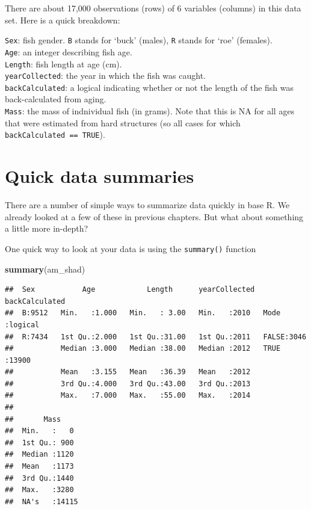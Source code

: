 \documentclass[
]{book}
\newenvironment{Shaded}{\begin{snugshade}}{\end{snugshade}}
\newcommand{\KeywordTok}[1]{\textcolor[rgb]{0.13,0.29,0.53}{\textbf{#1}}}
\newcommand{\NormalTok}[1]{#1}
\begin{document}
There are about 17,000 observations (rows) of 6 variables (columns) in this data set. Here is a quick breakdown:

\texttt{Sex}: fish gender. \texttt{B} stands for `buck' (males), \texttt{R} stands for `roe' (females).\\

\texttt{Age}: an integer describing fish age.\\

\texttt{Length}: fish length at age (cm).\\

\texttt{yearCollected}: the year in which the fish was caught.\\

\texttt{backCalculated}: a logical indicating whether or not the length
of the fish was back-calculated from aging.\\

\texttt{Mass}: the mass of indnividual fish (in grams). Note that this is NA
for all ages that were estimated from hard structures (so all
cases for which \texttt{backCalculated\ ==\ TRUE}).

\hypertarget{quick-data-summaries}{%
\section{Quick data summaries}\label{quick-data-summaries}}

There are a number of simple ways to summarize data quickly in base R. We already looked at a few of these in previous chapters. But what about something a little more in-depth?

One quick way to look at your data is using the \texttt{summary()} function

\begin{Shaded}
\begin{Highlighting}[]
\KeywordTok{summary}\NormalTok{(am_shad)}
\end{Highlighting}
\end{Shaded}

\begin{verbatim}
##  Sex           Age            Length      yearCollected  backCalculated 
##  B:9512   Min.   :1.000   Min.   : 3.00   Min.   :2010   Mode :logical  
##  R:7434   1st Qu.:2.000   1st Qu.:31.00   1st Qu.:2011   FALSE:3046     
##           Median :3.000   Median :38.00   Median :2012   TRUE :13900    
##           Mean   :3.155   Mean   :36.39   Mean   :2012                  
##           3rd Qu.:4.000   3rd Qu.:43.00   3rd Qu.:2013                  
##           Max.   :7.000   Max.   :55.00   Max.   :2014                  
##                                                                         
##       Mass      
##  Min.   :   0   
##  1st Qu.: 900   
##  Median :1120   
##  Mean   :1173   
##  3rd Qu.:1440   
##  Max.   :3280   
##  NA's   :14115
\end{verbatim}
\end{document}
